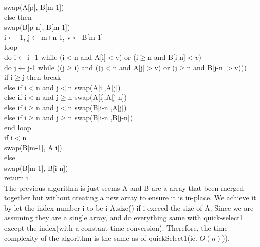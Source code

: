 \documentclass[12pt]{article}
\begin{document}
	\hphantom{1111} swap(A[p], B[m-1])\\
	else then\\
	\hphantom{1111} swap(B[p-n], B[m-1])\\
	i$\gets$-1, j$\gets$m+n-1, v$\gets$B[m-1]\\
	loop\\
	\hphantom{1111} do i$\gets$i+1 while (i$<$n and A[i]$<$v) or (i$\geq$n and B[i-n]$<v$)\\
	\hphantom{1111} do j$\gets$j-1 while ((j$\geq$i) and ((j$<$n and A[j]$>$v) or (j$\geq$n and B[j-n]$>$v)))\\
	\hphantom{1111} if i$\geq$j then break\\
	\hphantom{1111} else if i$<$n and j$<$n  swap(A[i],A[j])\\
	\hphantom{1111} else if i$<$n and j$\geq$n  swap(A[i],A[j-n])\\
	\hphantom{1111} else if i$\geq$n and j$<$n  swap(B[i-n],A[j])\\
	\hphantom{1111} else if i$\geq$n and j$\geq$n  swap(B[i-n],B[j-n])\\
	end loop\\
	if i$<$n\\
	\hphantom{1111} swap(B[m-1], A[i])\\
	else\\
	\hphantom{1111} swap(B[m-1], B[i-n])\\
	return i\\
	
	The previous algorithm is just seems A and B are a array that been merged together but without creating a new array to ensure it is in-place. We achieve it by let the index number i to be i-A.size() if i exceed the size of A. Since we are assuming they are a single array, and do everything same with quick-select1 except the index(with a constant time conversion). Therefore, the time complexity of the algorithm is the same as of quickSelect1(ie. $O(n)$)).
	
	
	
\end{document}
